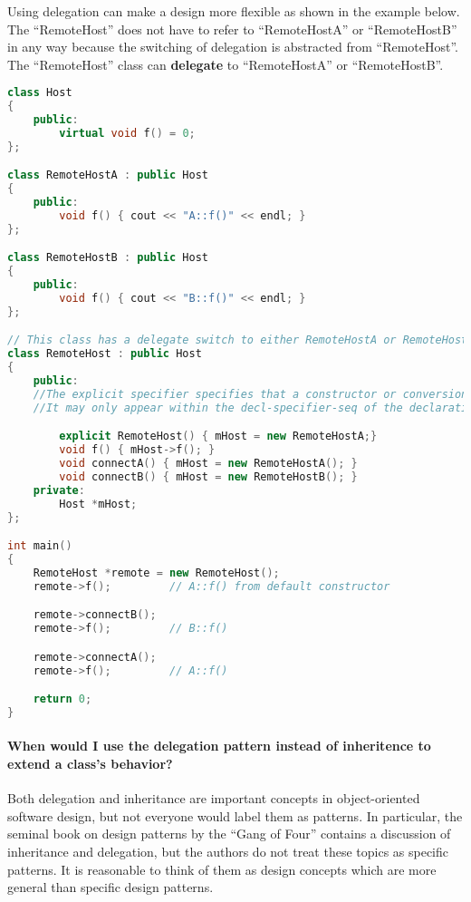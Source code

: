 \documentclass{book}
\begin{document}
Using delegation can make a design more flexible as shown in the example below.
The ``RemoteHost'' does not have to refer to ``RemoteHostA'' or ``RemoteHostB'' in any way because the switching of delegation is abstracted from ``RemoteHost''.
The ``RemoteHost'' class can \textbf{delegate} to ``RemoteHostA'' or ``RemoteHostB''.
\begin{lstlisting}[caption={Delegation Exmaple code 1},language=C++]
class Host
{
    public:
    	virtual void f() = 0;
};

class RemoteHostA : public Host
{
    public:
    	void f() { cout << "A::f()" << endl; }
};

class RemoteHostB : public Host
{
    public:
    	void f() { cout << "B::f()" << endl; }
};

// This class has a delegate switch to either RemoteHostA or RemoteHostB
class RemoteHost : public Host
{
    public:
    //The explicit specifier specifies that a constructor or conversion function (since C++11) doesn't allow implicit conversions or copy-initialization.
    //It may only appear within the decl-specifier-seq of the declaration of such a function within its class definition. 

    	explicit RemoteHost() { mHost = new RemoteHostA;}
        void f() { mHost->f(); }
        void connectA() { mHost = new RemoteHostA(); }
        void connectB() { mHost = new RemoteHostB(); }
    private:
    	Host *mHost;
};

int main()
{
    RemoteHost *remote = new RemoteHost();
    remote->f();         // A::f() from default constructor

    remote->connectB();
    remote->f();         // B::f()

    remote->connectA();
    remote->f();         // A::f()

    return 0;
}
\end{lstlisting}
\paragraph{When would I use the delegation pattern instead of inheritence to extend a class's behavior?}
Both delegation and inheritance are important concepts in object-oriented software design, but not everyone would label them as patterns.
In particular, the seminal book on design patterns by the “Gang of Four” contains a discussion of inheritance and delegation, but the authors do not treat these topics as specific patterns.
It is reasonable to think of them as design concepts which are more general than specific design patterns.
\end{document}

